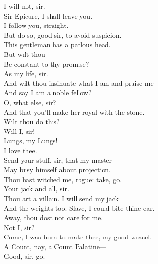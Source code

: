 \documentclass[a4paper,oneside,12pt]{memoir}
\begin{document}
\begin{drama*}
\surlyspeaks {} I will not, sir.\\
Sir Epicure, I shall leave you.\\
\mammonspeaks {} I follow you, straight.\\
\facespeaks But do so, good sir, to avoid suspicion.\\
This gentleman has a parlous head.\\
\mammonspeaks {} But wilt thou\\
Be constant to thy promise?\\
\facespeaks {} As my life, sir.\\
\mammonspeaks And wilt thou insinuate what I am and praise me\\
And say I am a noble fellow?\\
\facespeaks {} O, what else, sir?\\
And that you'll make her royal with the stone.\\
\mammonspeaks Wilt thou do this?\\
\facespeaks {} Will I, sir!\\
\mammonspeaks {} Lungs, my Lungs!\\
I love thee.\\
\facespeaks {} Send your stuff, sir, that my master\\
May busy himself about projection.\\
\mammonspeaks Thou hast witched me, rogue: take, go.\\
\facespeaks {} Your jack and all, sir.\\
\mammonspeaks Thou art a villain. I will send my jack\\
And the weights too. Slave, I could bite thine ear.\\
Away, thou dost not care for me.\\
\facespeaks {} Not I, sir?\\
\mammonspeaks Come, I was born to make thee, my good weasel.\\
 A Count, nay, a Count Palatine---\\
\facespeaks {} Good, sir, go.\\

\end{drama*}
\end{document}
